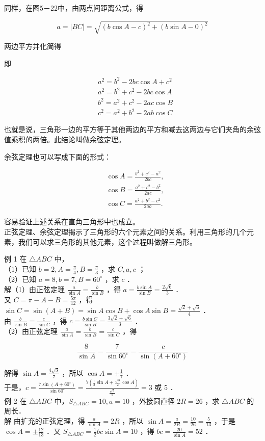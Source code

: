 \documentclass[10pt]{article}
\begin{document}
同样，在图5－22中，由两点间距离公式，得

\[
a=|B C|=\sqrt{(b \cos A-c)^{2}+(b \sin A-0)^{2}}
\]

两边平方并化简得

即

\[
\begin{aligned}
& a^{2}=b^{2}-2 b c \cos A+c^{2} \\
& a^{2}=b^{2}+c^{2}-2 b c \cos A \\
& b^{2}=a^{2}+c^{2}-2 a c \cos B \\
& c^{2}=a^{2}+b^{2}-2 a b \cos C
\end{aligned}
\]

也就是说，三角形一边的平方等于其他两边的平方和减去这两边与它们夹角的余弦值乘积的两倍。此结论叫做余弦定理。

余弦定理也可以写成下面的形式：

\[
\begin{aligned}
& \cos A=\frac{b^{2}+c^{2}-a^{2}}{2 b c}, \\
& \cos B=\frac{a^{2}+c^{2}-b^{2}}{2 a c}, \\
& \cos C=\frac{a^{2}+b^{2}-c^{2}}{2 a b} .
\end{aligned}
\]

容易验证上述关系在直角三角形中也成立。\\
正弦定理、余弦定理揭示了三角形的六个元素之间的关系。利用三角形的几个元素，我们可以求三角形的其他元素，这个过程叫做解三角形。

例 1 在 \(\triangle A B C\) 中，\\
（1）已知 \(b=2, A=\frac{\pi}{4}, B=\frac{\pi}{3}\) ，求 \(C, a, c\) ；\\
（2）已知 \(a=8, b=7, B=60^{\circ}\) ，求 \(c\) ．\\
解（1）由正弦定理 \(\frac{a}{\sin A}=\frac{b}{\sin B}\) ，得 \(a=\frac{b \sin A}{\sin B}=\frac{2 \sqrt{6}}{3}\) ．\\
又 \(C=\pi-A-B=\frac{5 \pi}{12}\) ，得 \(\sin C=\sin (A+B)=\sin A \cos B+\cos A \sin B=\frac{\sqrt{2}+\sqrt{6}}{4}\) ．\\
由 \(\frac{b}{\sin B}=\frac{c}{\sin C}\) ，得 \(c=\frac{b \sin C}{\sin B}=\frac{3 \sqrt{2}+\sqrt{6}}{3}\) ．\\
（2）由正弦定理 \(\frac{a}{\sin A}=\frac{b}{\sin B}=\frac{c}{\sin C}\) ，得

\[
\frac{8}{\sin A}=\frac{7}{\sin 60^{\circ}}=\frac{c}{\sin \left(A+60^{\circ}\right)}
\]

解得 \(\sin A=\frac{4 \sqrt{3}}{7}\) ，所以 \(\cos A= \pm \frac{1}{7}\) ．\\
于是，\(c=\frac{7 \sin \left(A+60^{\circ}\right)}{\sin 60^{\circ}}=\frac{7\left(\frac{1}{2} \sin A+\frac{\sqrt{3}}{2} \cos A\right)}{\frac{\sqrt{3}}{2}}=3\) 或 5 ．\\
例 2 在 \(\triangle A B C\) 中，\(S_{\triangle A B C}=10, a=10\) ，外接圆直径 \(2 R=26\) ，求 \(\triangle A B C\) 的周长．\\
解 由扩充的正弦定理，得 \(\frac{a}{\sin A}=2 R\) ，所以 \(\sin A=\frac{a}{2 R}=\frac{10}{26}=\frac{5}{13}\) ，于是 \(\cos A= \pm \frac{12}{13}\) ．又 \(S_{\triangle A B C}=\frac{1}{2} b c \sin A=10\) ，得 \(b c=\frac{20}{\sin A}=52\) ．
\end{document}

